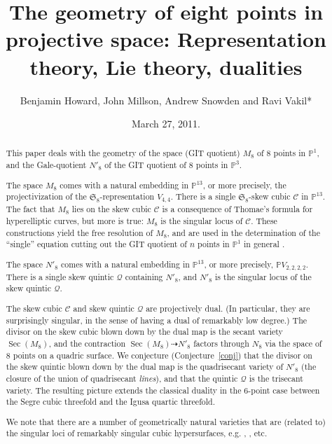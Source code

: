 \documentclass{amsart}
\title[Eight points in projective space]
  {The geometry of eight points in projective space:  Representation theory, Lie theory, dualities}
\author[Benjamin Howard, John Millson, Andrew Snowden and Ravi Vakil]
{Benjamin Howard, John Millson, Andrew Snowden and Ravi Vakil*}
\date{March 27, 2011.}
\theoremstyle{definition}
\theoremstyle{remark}
\DeclareMathOperator{\Sec}{Sec}
\def\SS{\mathfrak{S}}
\def\proj{\mathbb{P}}
\def\cubic{\mathcal{C}}
\def\quintic{\mathcal{Q}}
\begin{document}


\begin{abstract}
This paper deals with the geometry of the space (GIT quotient) $M_8$ of $8$
  points in $\proj^1$, and the Gale-quotient $N'_8$ of the GIT quotient
  of $8$ points in $\proj^3$.     

  The space $M_8$ comes with a natural embedding in $\proj^{13}$, or
  more precisely, the projectivization of the $\SS_8$-representation
  $V_{4,4}$.  There is a single $\SS_8$-skew cubic $\cubic$ in
  $\proj^{13}$.  The fact that $M_8$ lies on the skew cubic $\cubic$ is a consequence
  of Thomae's formula for hyperelliptic curves, but more is true:
  $M_8$ is the singular locus of $\cubic$.    These
  constructions yield the free resolution of $M_8$, and are used in
  the determination of the ``single'' equation cutting out the GIT
  quotient of $n$ points in $\proj^1$ in general \cite{hmsv2}.

The space $N'_8$ comes with a natural embedding in $\proj^{13}$,  or
more precisely, $\proj V_{2,2,2,2}$.  There is a single
skew quintic $\quintic$ containing $N'_8$, and $N'_8$ is the singular
locus of the skew quintic $\quintic$.

The skew cubic $\cubic$ and skew quintic $\quintic$ are projectively
dual.  (In particular, they are surprisingly singular, in the sense of
having a dual of remarkably low degree.)  The divisor on the skew
cubic blown down by the dual map is the secant variety $\Sec(M_8)$,
and the contraction $\Sec(M_8) \dashrightarrow N'_8$ factors through
$N_8$ via the space of $8$ points on a quadric surface.  We conjecture
(Conjecture~\ref{conj}) that the divisor on the skew quintic blown
down by the dual map is the quadrisecant variety of $N'_8$ (the
closure of the union of quadrisecant {\em lines}), and that the
quintic $\quintic$ is the trisecant variety.  The resulting picture
extends the classical duality in the 6-point case between the Segre
cubic threefold and the Igusa quartic threefold.

We note
  that there are a number of geometrically natural varieties that are
  (related to) the singular loci of remarkably singular cubic
  hypersurfaces, e.g.  \cite{ch}, \cite{beauville}, etc.
\end{abstract}


\maketitle
\end{document}
